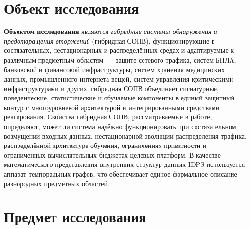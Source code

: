 \section*{Объект исследования}

\textbf{Объектом исследования} являются \emph{гибридные системы обнаружения и предотвращения вторжений} (гибридная СОПВ), функционирующие в состязательных, нестационарных и распределённых средах и адаптируемые к различным предметным областям~--- защите сетевого трафика, систем БПЛА, банковской и финансовой инфраструктуры, систем хранения медицинских данных, промышленного интернета вещей, систем управления критическими инфраструктурами и других. гибридная СОПВ объединяет сигнатурные, поведенческие, статистические и обучаемые компоненты в единый защитный контур с многоуровневой архитектурой и интегрированными средствами реагирования. Свойства гибридная СОПВ, рассматриваемые в работе, определяют, может ли система надёжно функционировать при состязательном возмущении входных данных, нестационарной эволюции распределения трафика, распределённой архитектуре обучения, ограничениях приватности и ограниченных вычислительных бюджетах целевых платформ. В качестве математического представления внутренних структур данных IDPS используется аппарат темпоральных графов, что обеспечивает единое формальное описание разнородных предметных областей.

\section*{Предмет исследования}

